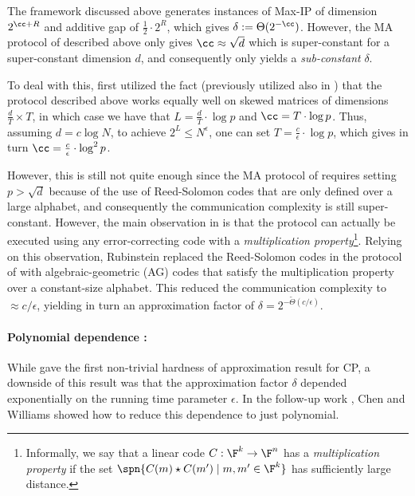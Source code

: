 \documentclass[11pt]{article}
\begin{document}
The \cite{ARW17} framework discussed above generates instances of Max-IP of dimension $2^{\cc+R}$ and additive gap  of $\frac 1 2\cdot 2^R$, which gives $\delta:=\Theta(2^{-\cc})$. However, the MA protocol of \cite{AW09} described above only gives $\cc \approx \sqrt{d} $ which is super-constant for a super-constant dimension $d$, and consequently only yields a \emph{sub-constant} $\delta$.


To deal with this, \cite{Rub18} first utilized the fact (previously utilized also in \cite{ARW17}) that the \cite{AW09} protocol described above works equally well on skewed matrices of dimensions $\frac d T \times T$, in which case we have that $L=\frac d T \cdot \log p$ and $\cc= T \cdot \log p$. 
Thus, assuming $d = c \log N$, to achieve $2^L \leq N^{\epsilon}$, one can set $T = \frac c \epsilon \cdot \log p $, which gives in turn $\cc=\frac c \epsilon \cdot \log ^2p$.

However, this is still not quite enough since the MA protocol of \cite{AW09} requires setting $p >  \sqrt{d}$ because of the use of Reed-Solomon codes that are only defined over a large alphabet, and consequently the communication complexity is still super-constant. However, the main observation in \cite{AW09} is that the protocol can actually be executed using any error-correcting code with a \emph{multiplication property}\footnote{Informally, we say that a linear code $C:\F^k \to \F^n$ has a \emph{multiplication property} if the set $\spn\{C(m) \star C(m') \mid m,m' \in \F^k  \}$ has sufficiently large distance.}. 
Relying on this observation, Rubinstein replaced the Reed-Solomon codes in the protocol of \cite{AW09} with algebraic-geometric (AG) codes that satisfy the multiplication property over a constant-size alphabet.
This reduced the communication complexity to $ \approx c/\epsilon$, yielding in turn an approximation factor of $\delta = 2^{- \tilde \Theta (c/\epsilon)}$. 

\paragraph{Polynomial dependence \cite{CW19}:}

While \cite{Rub18} gave the first non-trivial hardness of approximation result for CP, a downside of this result was that the approximation factor $\delta$ depended exponentially on the running time parameter $\epsilon$. In the follow-up work \cite{CW19}, Chen and Williams showed how to reduce this dependence to just polynomial.
\end{document}
